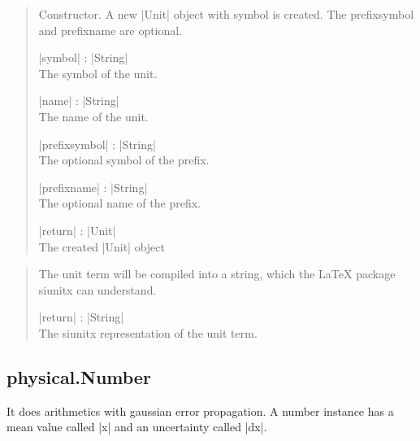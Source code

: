 \documentclass{ltxdoc}
\begin{document}
\begin{quote}
  Constructor. A new |Unit| object with symbol is created. The prefixsymbol and prefixname are optional. 

  \begin{description}
  \item |symbol| : |String|\\
    The symbol of the unit.

  \item |name| : |String|\\
    The name of the unit.

  \item |prefixsymbol| : |String|\\
    The optional symbol of the prefix. 

  \item |prefixname| : |String|\\
    The optional name of the prefix. 

  \item |return| : |Unit|\\
    The created |Unit| object
  \end{description}

\end{quote}




\begin{quote}
  The unit term will be compiled into a string, which the LaTeX package siunitx can understand.

  \begin{description}
  \item |return| : |String|\\
    The siunitx representation of the unit term.
  \end{description}

\end{quote}





\subsection{physical.Number}

It does arithmetics with gaussian error propagation. A number instance has a mean value called |x| and an uncertainty called |dx|.
\end{document}
